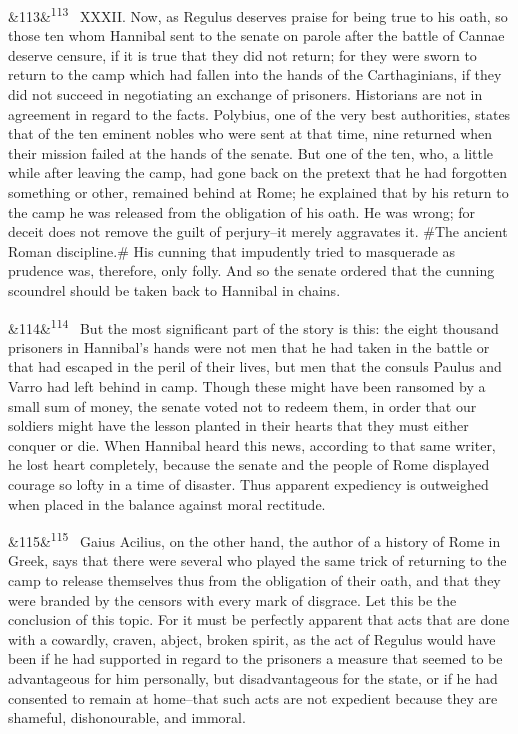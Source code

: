 \documentclass[12pt]{article}
\newcommand{\para}[1][]{\par\noindent\ifx&#1&\else\textsuperscript{\footnotesize #1}~\fi}
\begin{document}
\para[113] XXXII. Now, as Regulus deserves praise for being true to his oath, so those ten whom Hannibal sent to the senate on parole after the battle of Cannae deserve censure, if it is true that they did not return; for they were sworn to return to the camp which had fallen into the hands of the Carthaginians, if they did not succeed in negotiating an exchange of prisoners. Historians are not in agreement in regard to the facts. Polybius, one of the very best authorities, states that of the ten eminent nobles who were sent at that time, nine returned when their mission failed at the hands of the senate. But one of the ten, who, a little while after leaving the camp, had gone back on the pretext that he had forgotten something or other, remained behind at Rome; he explained that by his return to the camp he was released from the obligation of his oath. He was wrong; for deceit does not remove the guilt of perjury--it merely aggravates it. \#The ancient Roman discipline.\# His cunning that impudently tried to masquerade as prudence was, therefore, only folly. And so the senate ordered that the cunning scoundrel should be taken back to Hannibal in chains.

\para[114] But the most significant part of the story is this: the eight thousand prisoners in Hannibal's hands were not men that he had taken in the battle or that had escaped in the peril of their lives, but men that the consuls Paulus and Varro had left behind in camp. Though these might have been ransomed by a small sum of money, the senate voted not to redeem them, in order that our soldiers might have the lesson planted in their hearts that they must either conquer or die. When Hannibal heard this news, according to that same writer, he lost heart completely, because the senate and the people of Rome displayed courage so lofty in a time of disaster. Thus apparent expediency is outweighed when placed in the balance against moral rectitude.

\para[115] Gaius Acilius, on the other hand, the author of a history of Rome in Greek, says that there were several who played the same trick of returning to the camp to release themselves thus from the obligation of their oath, and that they were branded by the censors with every mark of disgrace. Let this be the conclusion of this topic. For it must be perfectly apparent that acts that are done with a cowardly, craven, abject, broken spirit, as the act of Regulus would have been if he had supported in regard to the prisoners a measure that seemed to be advantageous for him personally, but disadvantageous for the state, or if he had consented to remain at home--that such acts are not expedient because they are shameful, dishonourable, and immoral.
\end{document}
